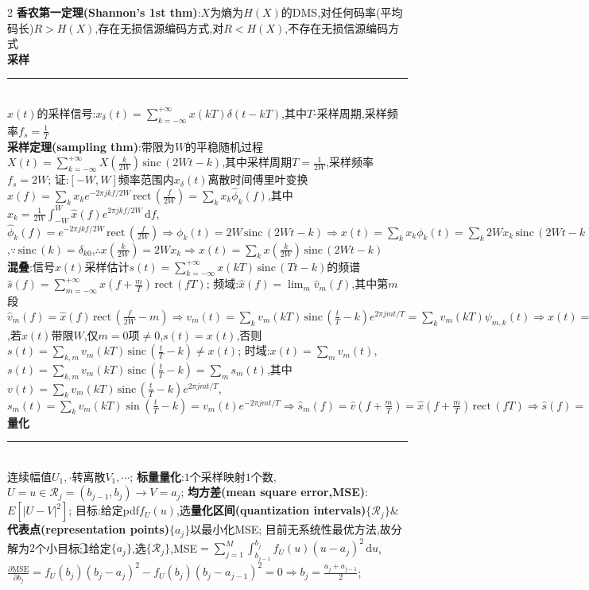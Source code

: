 \documentclass[UTF8,a4paper,10pt]{article}
\providecommand{\abs}[1]{\left\lvert#1\right\rvert}
\providecommand{\sinc}{\,\text{sinc}\,}
\providecommand{\Pi}{\,\text{rect}\,}
\begin{document}
\begin{multicols*}{2}
\textbf{香农第一定理(Shannon's 1st thm)}:$X$为熵为$H(X)$的DMS,对任何码率(平均码长)$R>H(X)$,存在无损信源编码方式,对$R<H(X)$,不存在无损信源编码方式\\
\textbf{采样}\rule{\columnwidth-}{.2pt}\\
$x(t)$的采样信号:$x_{\delta}(t)=\sum_{k=-\infty}^{+\infty}x(kT)\delta(t-kT)$,其中$T$-采样周期,采样频率$f_s=\frac{1}{T}$\\
\textbf{采样定理(sampling thm)}:带限为$W$的平稳随机过程$X(t)=\sum_{k=-\infty}^{+\infty}X(\frac{k}{2W})\sinc(2Wt-k)$,其中采样周期$T=\frac{1}{2W}$,采样频率$f_s=2W$;%
    证:$[-W,W]$频率范围内$x_{\delta}(t)$离散时间傅里叶变换$\hat{x}(f)=\sum_kx_ke^{-2\pi jkf/2W}\Pi(\frac{f}{2W})=\sum_kx_k\hat{\phi}_k(f)$,其中$x_k=\frac{1}{2W}\int_{-W}^W\hat{x}(f)e^{2\pi jkf/2W}\,\mathrm{d}f$,$\hat{\phi}_k(f)=e^{-2\pi jkf/2W}\Pi(\frac{f}{2W})\Rightarrow\phi_k(t)=2W\sinc(2Wt-k)\Rightarrow x(t)=\sum_kx_k\phi_k(t)=\sum_k2Wx_k\sinc(2Wt-k)$,$\because\sinc(k)=\delta_{k0}$,$\therefore x(\frac{k}{2W})=2Wx_k\Rightarrow x(t)=\sum_kx(\frac{k}{2W})\sinc(2Wt-k)$\\
\textbf{混叠}:信号$x(t)$采样估计$s(t)=\sum_{k=-\infty}^{+\infty}x(kT)\sinc(Tt-k)$的频谱$\hat{s}(f)=\sum_{m=-\infty}^{+\infty}\hat{x}(f+\frac{m}{T})\Pi(fT)$;%
    频域:$\hat{x}(f)=\lim_m\hat{v}_m(f)$,其中第$m$段$\hat{v}_m(f)=\hat{x}(f)\Pi(\frac{f}{2W}-m)\Rightarrow v_m(t)=\sum_kv_m(kT)\sinc(\frac{t}{T}-k)e^{2\pi jmt/T}=\sum_kv_m(kT)\psi_{m,k}(t)\Rightarrow x(t)=\sum_{m,k}v_m(kT)\sinc(\frac{t}{T}-k)e^{2\pi jmt/T}$,若$x(t)$带限$W$,仅$m=0$项$\neq 0$,$s(t)=x(t)$,否则$s(t)=\sum_{k,m}v_m(kT)\sinc(\frac{t}{T}-k)\neq x(t)$;%
    时域:$x(t)=\sum_mv_m(t)$,$s(t)=\sum_{k,m}v_m(kT)\sinc(\frac{t}{T}-k)=\sum_ms_m(t)$,其中$v(t)=\sum_kv_m(kT)\sinc(\frac{t}{T}-k)e^{2\pi jmt/T}$,$s_m(t)=\sum_kv_m(kT)\sin(\frac{t}{T}-k)=v_m(t)e^{-2\pi jmt/T}\Rightarrow\hat{s}_m(f)=\hat{v}(f+\frac{m}{T})=\hat{x}(f+\frac{m}{T})\Pi(fT)\Rightarrow\hat{s}(f)=\sum_m\hat{x}(f+\frac{m}{T})\Pi(fT)$\\
\textbf{量化}\rule{\columnwidth-}{.2pt}\\
连续幅值$U_1,\cdot$转离散$V_1,\cdots$;%
    \textbf{标量量化}:$1$个采样映射$1$个数,$U=u\in\mathcal{R}_j=(b_{j-1},b_j)\rightarrow V=a_j$;%
    \textbf{均方差(mean square error,MSE)}:$E[\abs{U-V}^2]$;%
    目标:给定pdf$f_U(u)$,选\textbf{量化区间(quantization intervals)}$\{\mathcal{R}_j\}$\&\textbf{代表点(representation points)}$\{a_j\}$以最小化MSE;%
    目前无系统性最优方法,故分解为$2$个小目标:\textcircled{1}给定$\{a_j\}$,选$\{\mathcal{R}_j\}$,MSE$=\sum_{j=1}^M\int_{b_{j-1}}^{b_j}f_U(u)(u-a_j)^2\,\mathrm{d}u$,$\frac{\partial\text{MSE}}{\partial b_j}=f_U(b_j)(b_j-a_j)^2-f_U(b_j)(b_j-a_{j-1})^2=0\Rightarrow b_j=\frac{a_j+a_{j-1}}{2}$;%

\end{multicols*}
\end{document}
